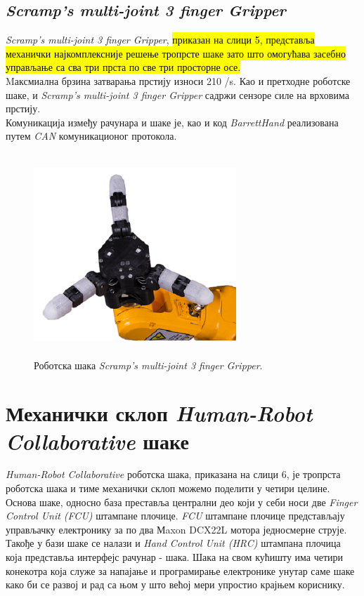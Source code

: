 \documentclass{article}
\begin{document}
\subsection{\textit{Scramp’s multi-joint 3 finger Gripper}} 
\textit{Scramp’s multi-joint 3 finger Gripper}, \hl{приказан на слици 5, представља механички најкомплексније решење тропрсте шаке зато што омогућава засебно 
управљање са сва три прста по све три просторне осе.} \\Mаксмиална брзина затварања прстију износи 210 \degree/s. Као и претходне роботске шаке, и 
\textit{Scramp’s multi-joint 3 finger Gripper} садржи сензоре силе на врховима прстију.\\Комуникација између рачунара и шаке је, као и код \textit{BarrettHand} реализована 
путем \textit{CAN} комуникационог протокола.  \cite{scram}
\begin{figure}[H]
\centering
\includegraphics[width=3in, height=3in]{Images/Saka4.png}
\caption{Роботска шака \textit{Scramp’s multi-joint 3 finger Gripper}. \cite{scram}}
\label{fig:figure5}
\end{figure}
\clearpage

\section{Механички склоп \textit{Human-Robot Collaborative} шаке}
\textit{Human-Robot Collaborative} роботска шака, приказана на слици 6, је тропрста роботска шака и тиме
механички склоп можемо поделити у четири целине.\\ 
Основа шаке, односно база преставља централни део који у себи
носи две \textit{Finger Control Unit (FCU)} штампане плочице. \textit{FCU} штампане плочице представљају управљачку електронику за по два 
Мaxon DCX22L мотора једносмерне струје. Такође у бази шаке се налази и \textit{Hand Control Unit (HRC)} штампана плочица која представља интерфејс 
рачунар - шака. Шака на свом кућишту има четири конекотра која служе за напајање и програмирање електронике
унутар саме шаке како би се развој и рад са њом у што већој мери упростио крајњем кориснику.\\
\end{document}
